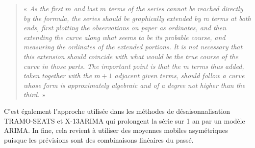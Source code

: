 \documentclass[
  11pt,
  french,
  a4paper]{article}
\newcommand\1{\mathds{1}}
\begin{document}
\begin{quote}
« \emph{As the first \(m\) and last \(m\) terms of the series cannot be reached directly by the formula, the series should be graphically extended by m terms at both ends, first plotting the observations on paper as ordinates, and then extending the curve along what seems to be its probable course, and measuring the ordinates of the extended portions.}
\emph{It is not necessary that this extension should coincide with what would be the true course of the curve in those parts. }
\emph{The important point is that the m terms thus added, taken together with the \(m+1\) adjacent given terms, should follow a curve whose form is approximately algebraic and of a degree not higher than the third.} »

\end{quote}

C'est également l'approche utilisée dans les méthodes de désaisonnalisation TRAMO-SEATS et X-13ARIMA qui prolongent la série sur 1 an par un modèle ARIMA.
In fine, cela revient à utiliser des moyennes mobiles asymétriques puisque les prévisions sont des combinaisons linéaires du passé.
\end{document}
